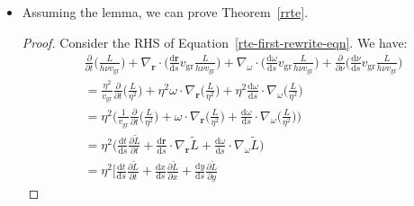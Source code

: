\documentclass[10pt]{article}
\newtheorem{lemma}{Lemma}[section]
\newcommand{\dee}{\mathrm{d}}
\newcommand{\ve}[1]{\mathbf{#1}}
\newcommand{\group}{\mathrm{gr}}
\begin{document}
\begin{itemize}
    \begin{lemma} \label{position-and-direction-deriv}
      \begin{align*}
        \omega \cdot \nabla_{\ve{r}} L
        + \nabla_{\omega} \cdot \bigg( \frac{\dee \omega}{\dee s} L \bigg)
        = \eta^2 \omega \cdot \nabla_{\ve{r}} \bigg( \frac{L}{\eta^2} \bigg)
        + \eta^2 \frac{\dee \omega}{\dee s} \cdot \nabla_{\omega} \bigg( \frac{L}{\eta^2} \bigg)
      \end{align*}
    \end{lemma}

    Since the proofs for the lemmas are very involved, they will be provided later in the following subsections.

    \item Assuming the lemma, we can prove Theorem~\ref{rrte}.
    \begin{proof}
      Consider the RHS of Equation~\eqref{rte-first-rewrite-eqn}. We have:
      \begin{align*}
        & \frac{\partial}{\partial t}\bigg(\frac{L}{h \nu v_\group}\bigg)
        + \nabla_{\ve{r}} \cdot \bigg( \frac{\dee \ve{r}}{\dee s} v_\group \frac{L}{h \nu v_\group} \bigg)
        + \nabla_{\omega} \cdot \bigg( \frac{\dee \omega}{\dee s} v_\group \frac{L}{h \nu v_\group} \bigg)
        + \frac{\partial}{\partial \nu} \bigg( \frac{\dee \nu}{\dee s} v_\group \frac{L}{h \nu v_\group} \bigg)\\
        &= \frac{\eta^2}{v_\group} \frac{\partial}{\partial t} \bigg( \frac{L}{\eta^2} \bigg)
        + \eta^2 \omega \cdot \nabla_{\ve{r}} \bigg( \frac{L}{\eta^2} \bigg)
        + \eta^2 \frac{\dee \omega}{\dee s} \cdot \nabla_{\omega} \bigg( \frac{L}{\eta^2} \bigg) \\
        &= \eta^2 \bigg( 
        \frac{1}{v_\group} \frac{\partial}{\partial t} \bigg( \frac{L}{\eta^2} \bigg)
        + \omega \cdot \nabla_{\ve{r}} \bigg( \frac{L}{\eta^2} \bigg)
        + \frac{\dee \omega}{\dee s} \cdot \nabla_{\omega} \bigg( \frac{L}{\eta^2} \bigg)
        \bigg) \\
        &= \eta^2 \bigg( 
        \frac{\dee t}{\dee s} \frac{\partial \tilde L}{\partial t} 
        + \frac{\dee \ve{r}}{\dee s} \cdot \nabla_{\ve{r}} \tilde L
        + \frac{\dee \omega}{\dee s} \cdot \nabla_{\omega} \tilde L
        \bigg) \\
        &= \eta^2 \bigg[ 
        \frac{\dee t}{\dee s} \frac{\partial \tilde L}{\partial t} 
        + \frac{\dee x}{\dee s} \frac{\partial \tilde L}{\partial x}
        + \frac{\dee y}{\dee s} \frac{\partial \tilde L}{\partial y}

\end{align*}
\end{proof}
\end{itemize}
\end{document}
